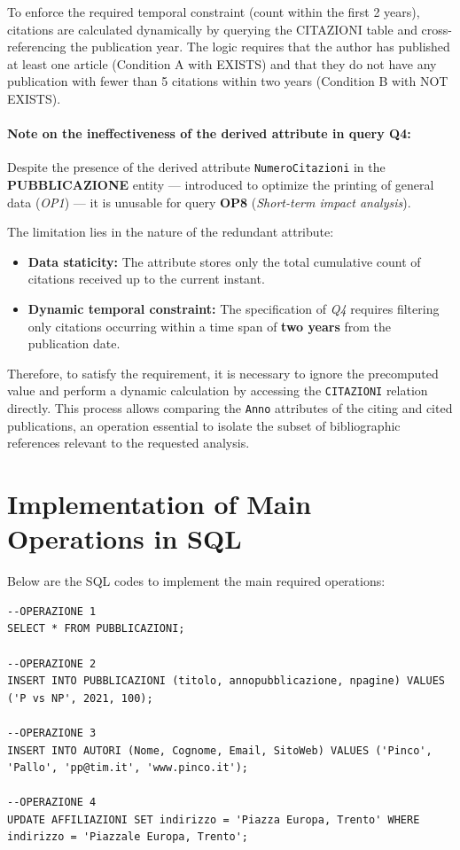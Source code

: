 \documentclass[a4paper,12pt]{article}
\begin{document}
To enforce the required temporal constraint (count within the first 2 years), citations are calculated dynamically by querying the CITAZIONI table and cross-referencing the publication year. The logic requires that the author has published at least one article (Condition A with EXISTS) and that they do not have any publication with fewer than 5 citations within two years (Condition B with NOT EXISTS).

\paragraph{Note on the ineffectiveness of the derived attribute in query Q4:}
Despite the presence of the derived attribute \texttt{NumeroCitazioni} in the \textbf{PUBBLICAZIONE} entity --- introduced to optimize the printing of general data (\textit{OP1}) --- it is unusable for query \textbf{OP8} (\textit{Short-term impact analysis}).

The limitation lies in the nature of the redundant attribute:
\begin{itemize}
    \item \textbf{Data staticity:} The attribute stores only the total cumulative count of citations received up to the current instant.
    \item \textbf{Dynamic temporal constraint:} The specification of \textit{Q4} requires filtering only citations occurring within a time span of \textbf{two years} from the publication date.
\end{itemize}

Therefore, to satisfy the requirement, it is necessary to ignore the precomputed value and perform a dynamic calculation by accessing the \texttt{CITAZIONI} relation directly. This process allows comparing the \texttt{Anno} attributes of the citing and cited publications, an operation essential to isolate the subset of bibliographic references relevant to the requested analysis.
\section{Implementation of Main Operations in SQL}
Below are the SQL codes to implement the main required operations:
\begin{lstlisting}
--OPERAZIONE 1
SELECT * FROM PUBBLICAZIONI;

--OPERAZIONE 2
INSERT INTO PUBBLICAZIONI (titolo, annopubblicazione, npagine) VALUES ('P vs NP', 2021, 100);

--OPERAZIONE 3
INSERT INTO AUTORI (Nome, Cognome, Email, SitoWeb) VALUES ('Pinco', 'Pallo', 'pp@tim.it', 'www.pinco.it');

--OPERAZIONE 4
UPDATE AFFILIAZIONI SET indirizzo = 'Piazza Europa, Trento' WHERE indirizzo = 'Piazzale Europa, Trento';

\end{lstlisting}
\newpage
\end{document}
